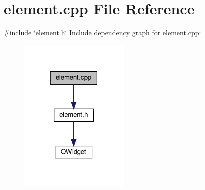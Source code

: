 \section{element.\+cpp File Reference}
\label{element_8cpp}
{\ttfamily \#include \char`\"{}element.\+h\char`\"{}}\newline
Include dependency graph for element.\+cpp\+:
\nopagebreak
\begin{figure}[H]
\begin{center}
\leavevmode
\includegraphics[width=150pt]{element_8cpp__incl}
\end{center}
\end{figure}
